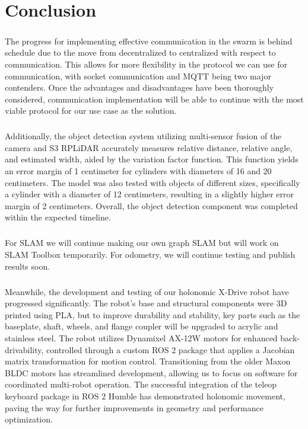 \chapter{Conclusion}

\paragraph*{}
The progress for implementing effective communication in the swarm is behind schedule due to the move from decentralized to centralized with respect to communication. This allows for more flexibility in the protocol we can use for communication, with socket communication and MQTT being two major contenders. Once the advantages and disadvantages have been thoroughly considered, communication implementation will be able to continue with the most viable protocol for our use case as the solution.

\paragraph*{}
Additionally, the object detection system utilizing multi-sensor fusion of the camera and S3 RPLiDAR accurately measures relative distance, relative angle, and estimated width, aided by the variation factor function. This function yields an error margin of 1 centimeter for cylinders with diameters of 16 and 20 centimeters. The model was also tested with objects of different sizes, specifically a cylinder with a diameter of 12 centimeters, resulting in a slightly higher error margin of 2 centimeters. Overall, the object detection component was completed within the expected timeline.

\paragraph*{}
For SLAM we will continue making our own graph SLAM but will work on SLAM Toolbox temporarily. For odometry, we will continue testing and publish results soon.

\paragraph*{}
Meanwhile, the development and testing of our holonomic X-Drive robot have progressed significantly. The robot’s base and structural components were 3D printed using PLA, but to improve durability and stability, key parts such as the baseplate, shaft, wheels, and flange coupler will be upgraded to acrylic and stainless steel. The robot utilizes Dynamixel AX-12W motors for enhanced back-drivability, controlled through a custom ROS 2 package that applies a Jacobian matrix transformation for motion control. Transitioning from the older Maxon BLDC motors has streamlined development, allowing us to focus on software for coordinated multi-robot operation. The successful integration of the teleop keyboard package in ROS 2 Humble has demonstrated holonomic movement, paving the way for further improvements in geometry and performance optimization.


